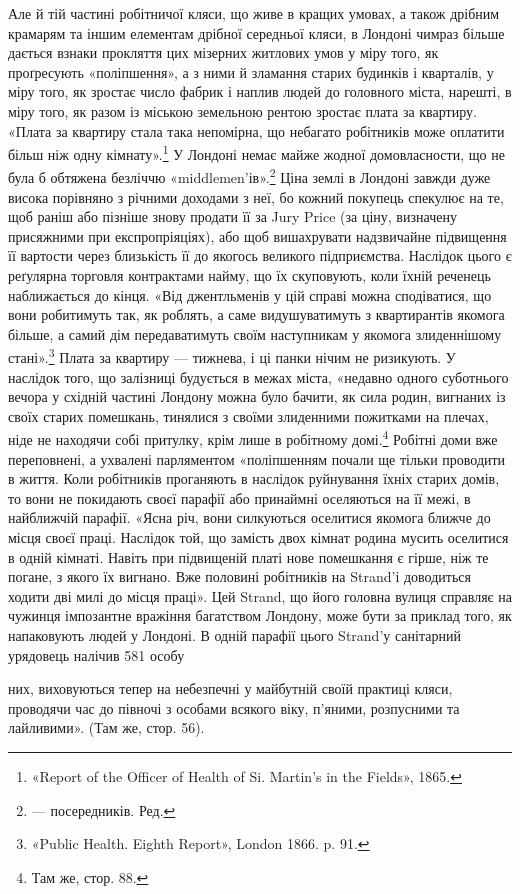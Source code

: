 Але й тій частині робітничої кляси, що живе в кращих умовах,
а також дрібним крамарям та іншим елементам дрібної
середньої кляси, в Лондоні чимраз більше дається взнаки прокляття
цих мізерних житлових умов у міру того, як проґресують
«поліпшення», а з ними й зламання старих будинків і кварталів,
у міру того, як зростає число фабрик і наплив людей до головного
міста, нарешті, в міру того, як разом із міською земельною
рентою зростає плата за квартиру. «Плата за квартиру стала
така непомірна, що небагато робітників може оплатити більш
ніж одну кімнату».\footnote{
«Report of the Officer of Health of Si. Martin’s in the Fields», 1865.
} У Лондоні немає майже жодної домовласности,
що не була б обтяжена безліччю «middlemen’ів».\footnote*{
— посередників. Ред.
} Ціна
землі в Лондоні завжди дуже висока порівняно з річними доходами
з неї, бо кожний покупець спекулює на те, щоб раніш або
пізніше знову продати її за Jury Price (за ціну, визначену присяжними
при експропріяціях), або щоб вишахрувати надзвичайне
підвищення її вартости через близькість її до якогось великого
підприємства. Наслідок цього є реґулярна торговля контрактами
найму, що їх скуповують, коли їхній реченець наближається
до кінця. «Від джентльменів у цій справі можна сподіватися, що
вони робитимуть так, як роблять, а саме видушуватимуть з
квартирантів якомога більше, а самий дім передаватимуть своїм
наступникам у якомога злиденнішому стані».\footnote{
«Public Health. Eighth Report», London 1866. p. 91.
} Плата за квартиру
— тижнева, і ці панки нічим не ризикують. У наслідок
того, що залізниці будується в межах міста, «недавно одного
суботнього вечора у східній частині Лондону можна було бачити,
як сила родин, вигнаних із своїх старих помешкань, тинялися
з своїми злиденними пожитками на плечах, ніде не находячи
собі притулку, крім лише в робітному домі.\footnote{
Там же, стор. 88.
} Робітні
доми вже переповнені, а ухвалені парляментом «поліпшенням
почали ще тільки проводити в життя. Коли робітників проганяють
в наслідок руйнування їхніх старих домів, то вони не покидають
своєї парафії або принаймні оселяються на її межі, в найближчій
парафії. «Ясна річ, вони силкуються оселитися якомога
ближче до місця своєї праці. Наслідок той, що замість двох кімнат
родина мусить оселитися в одній кімнаті. Навіть при підвищеній
платі нове помешкання є гірше, ніж те погане, з якого їх вигнано.
Вже половині робітників на Strand’і доводиться ходити дві милі
до місця праці». Цей Strand, що його головна вулиця справляє
на чужинця імпозантне вражіння багатством Лондону, може
бути за приклад того, як напаковують людей у Лондоні. В одній
парафії цього Strand’у санітарний урядовець налічив 581 особу

них, виховуються тепер на небезпечні у майбутній своїй практиці кляси,
проводячи час до півночі з особами всякого віку, п'яними, розпусними та
лайливими». (Там же, стор. 56).
\parbreak{}  %
